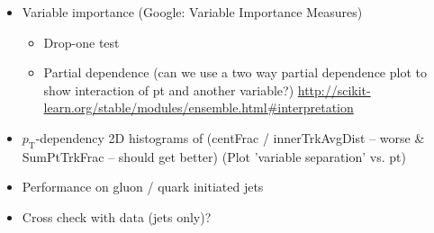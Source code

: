 \begin{itemize}
\item Variable importance (Google: Variable Importance Measures)
  \begin{itemize}
  \item Drop-one test
  \item Partial dependence (can we use a two way partial dependence plot to
    show interaction of pt and another variable?)
    \url{http://scikit-learn.org/stable/modules/ensemble.html#interpretation}
  \end{itemize}

\item $p_\mathrm{T}$-dependency 2D histograms of (centFrac / innerTrkAvgDist --
  worse \& SumPtTrkFrac -- should get better) (Plot 'variable separation' vs.
  pt)

\item Performance on gluon / quark initiated jets

\item Cross check with data (jets only)?

\end{itemize}

